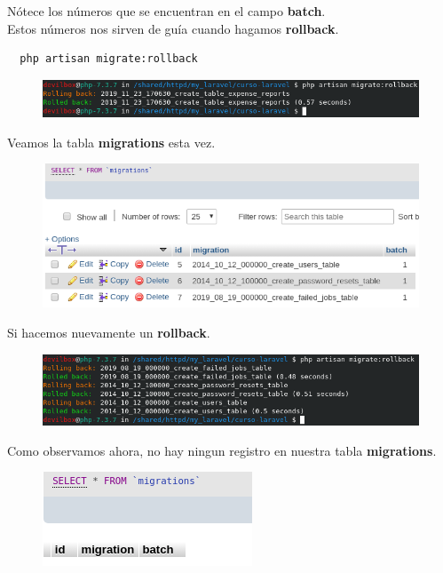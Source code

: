 \documentclass{article}
\begin{document}
Nótece los números que se encuentran en el campo \textbf{batch}.\\
Estos números nos sirven de guía cuando hagamos \textbf{rollback}.

\begin{verbatim}
  php artisan migrate:rollback
\end{verbatim}

\begin{figure}[h!]
  \centering
  \includegraphics[scale=0.5]{./Pictures/032_rollback.png}
\end{figure}

Veamos la tabla \textbf{migrations} esta vez.

\begin{figure}[h!]
  \centering
  \includegraphics[scale=0.5]{./Pictures/033_migrations_table.png}
\end{figure}

Si hacemos nuevamente un \textbf{rollback}.

\begin{figure}[h!]
  \centering
  \includegraphics[scale=0.5]{./Pictures/034_rolback.png}
\end{figure}

Como observamos ahora, no hay ningun registro en nuestra tabla
\textbf{migrations}.

\begin{figure}[h!]
  \centering
  \includegraphics[scale=0.5]{./Pictures/035_migrations_table.png}
\end{figure}
\end{document}
